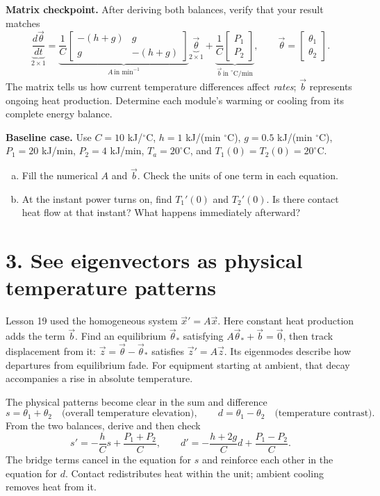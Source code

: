 \documentclass[10pt,letterpaper]{article}
\newcommand{\work}[1]{\vspace{#1}}
\begin{document}
\textbf{Matrix checkpoint.} After deriving both balances, verify that your result matches
\[
\underbrace{\frac{d\vec\theta}{dt}}_{2\times1}=
\underbrace{\frac{1}{C}
\begin{bmatrix}-(h+g)&g\\g&-(h+g)\end{bmatrix}}_{A\,\text{in min}^{-1}}
\underbrace{\vec\theta}_{2\times1}
+\underbrace{\frac1C\begin{bmatrix}P_1\\P_2\end{bmatrix}}_{\vec b\,\text{in }^\circ\mathrm C/\text{min}},
\qquad \vec\theta=\begin{bmatrix}\theta_1\\\theta_2\end{bmatrix}.
\]
The matrix tells us how current temperature differences affect \emph{rates}; $\vec b$ represents ongoing heat production. Determine each module's warming or cooling from its complete energy balance.

\textbf{Baseline case.} Use $C=10$ kJ/$^\circ$C, $h=1$ kJ/(min $^\circ$C), $g=0.5$ kJ/(min $^\circ$C), $P_1=20$ kJ/min, $P_2=4$ kJ/min, $T_a=20^\circ$C, and $T_1(0)=T_2(0)=20^\circ$C.
\begin{enumerate}[d.,leftmargin=*]
\item Fill the numerical $A$ and $\vec b$. Check the units of one term in each equation.\work{0.43in}
\item At the instant power turns on, find $T_1'(0)$ and $T_2'(0)$. Is there contact heat flow at that instant? What happens immediately afterward?\work{0.39in}
\end{enumerate}

\newpage
\section*{3. See eigenvectors as physical temperature patterns}
Lesson 19 used the homogeneous system $\vec x'=A\vec x$. Here constant heat production adds the term $\vec b$. Find an equilibrium $\vec\theta_*$ satisfying $A\vec\theta_*+\vec b=\vec0$, then track displacement from it: $\vec z=\vec\theta-\vec\theta_*$ satisfies $\vec z'=A\vec z$. Its eigenmodes describe how departures from equilibrium fade. For equipment starting at ambient, that decay accompanies a rise in absolute temperature.

The physical patterns become clear in the sum and difference
\[
s=\theta_1+\theta_2 \quad\text{(overall temperature elevation)},\qquad
d=\theta_1-\theta_2 \quad\text{(temperature contrast)}.
\]
From the two balances, derive and then check
\[
s'=-\frac{h}{C}s+\frac{P_1+P_2}{C},\qquad
d'=-\frac{h+2g}{C}d+\frac{P_1-P_2}{C}.
\]
The bridge terms cancel in the equation for $s$ and reinforce each other in the equation for $d$. Contact redistributes heat within the unit; ambient cooling removes heat from it.
\end{document}
